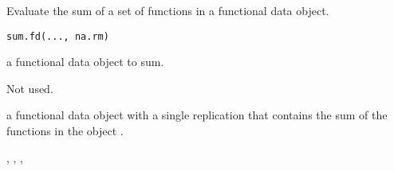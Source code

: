 \begin{Description}\relax
Evaluate the sum of a set of functions in a functional data object.
\end{Description}
\begin{Usage}
\begin{verbatim}
sum.fd(..., na.rm)
\end{verbatim}
\end{Usage}
\begin{Arguments}
\begin{ldescription}
\item[\code{...}] a functional data object to sum.

\item[\code{na.rm}] Not used.
\end{ldescription}
\end{Arguments}
\begin{Value}
a functional data object with a single replication
that contains the sum of the functions in the object .
\end{Value}
\begin{SeeAlso}\relax
{}, 
, 
, 
\end{SeeAlso}

